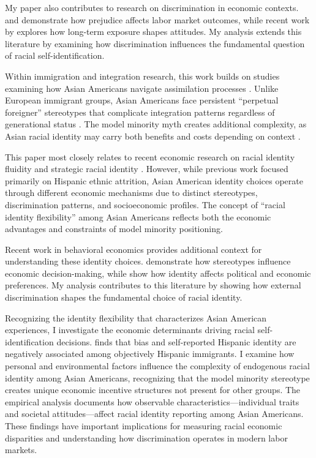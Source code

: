 My paper also contributes to research on discrimination in economic contexts. \textcite{bertrandAreEmilyGreg2004} and \textcite{charlesPrejudiceWagesEmpirical2008} demonstrate how prejudice affects labor market outcomes, while recent work by \textcite{bursztynImmigrantNextDoor2022} explores how long-term exposure shapes attitudes. My analysis extends this literature by examining how discrimination influences the fundamental question of racial self-identification.

Within immigration and integration research, this work builds on studies examining how Asian Americans navigate assimilation processes \autocite{abramitzkyCulturalAssimilationAge2016,abramitzkyNationImmigrantsAssimilation2014}. Unlike European immigrant groups, Asian Americans face persistent ``perpetual foreigner'' stereotypes that complicate integration patterns regardless of generational status \autocite{foukaImmigrantsAmericansRace2022}. The model minority myth creates additional complexity, as Asian racial identity may carry both benefits and costs depending on context \autocite{mengIntermarriageEconomicAssimilation2005}.

This paper most closely relates to recent economic research on racial identity fluidity and strategic racial identity \autocite{hadah2024hispanicidentity, antmanEthnicAttritionObserved2016,antmanIncentivesIdentifyRacial2015,antmanAmericanIndianCasinos2021}. However, while previous work focused primarily on Hispanic ethnic attrition, Asian American identity choices operate through different economic mechanisms due to distinct stereotypes, discrimination patterns, and socioeconomic profiles. The concept of ``racial identity flexibility'' among Asian Americans reflects both the economic advantages and constraints of model minority positioning.

Recent work in behavioral economics provides additional context for understanding these identity choices. \textcite{bordaloStereotypes2016} demonstrate how stereotypes influence economic decision-making, while \textcite{bonomiIdentityBeliefsPolitical2021} show how identity affects political and economic preferences. My analysis contributes to this literature by showing how external discrimination shapes the fundamental choice of racial identity.

Recognizing the identity flexibility that characterizes Asian American experiences, I investigate the economic determinants driving racial self-identification decisions. \textcite{hadah2024hispanicidentity} finds that bias and self-reported Hispanic identity are negatively associated among objectively Hispanic immigrants. I examine how personal and environmental factors influence the complexity of endogenous racial identity among Asian Americans, recognizing that the model minority stereotype creates unique economic incentive structures not present for other groups. The empirical analysis documents how observable characteristics---individual traits and societal attitudes---affect racial identity reporting among Asian Americans. These findings have important implications for measuring racial economic disparities and understanding how discrimination operates in modern labor markets.

